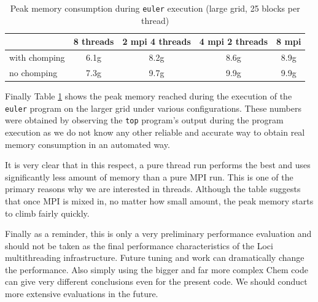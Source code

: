 \documentclass{article}
\begin{document}
\begin{table}[h]
  \begin{center}
    \caption{Peak memory consumption during \texttt{euler} execution (large grid, 25 blocks per thread)\label{tab:euler-mem-large}}
    \begin{tabular}{|l|c|c|c|c|}
      \hline
      & 8 threads & 2 mpi 4 threads & 4 mpi 2 threads & 8 mpi\\
      \hline
      with chomping & 6.1g & 8.2g & 8.6g & 8.9g\\ 
      no chomping & 7.3g & 9.7g & 9.9g & 9.9g\\
      \hline
    \end{tabular}
  \end{center}
\end{table}
Finally Table \ref{tab:euler-mem-large} shows the peak memory reached
during the execution of the \texttt{euler} program on the larger grid
under various configurations.  These numbers were obtained by observing
the \texttt{top} program's output during the program execution as we do
not know any other reliable and accurate way to obtain real memory
consumption in an automated way.

It is very clear that in this respect, a pure thread run performs the
best and uses significantly less amount of memory than a pure MPI run.
This is one of the primary reasons why we are interested in threads.
Although the table suggests that once MPI is mixed in, no matter how
small amount, the peak memory starts to climb fairly quickly.

Finally as a reminder, this is only a very preliminary performance
evaluation and should not be taken as the final performance
characteristics of the Loci multithreading infrastructure.  Future
tuning and work can dramatically change the performance.  Also simply
using the bigger and far more complex Chem code can give very different
conclusions even for the present code.  We should conduct more extensive
evaluations in the future.
\end{document}
